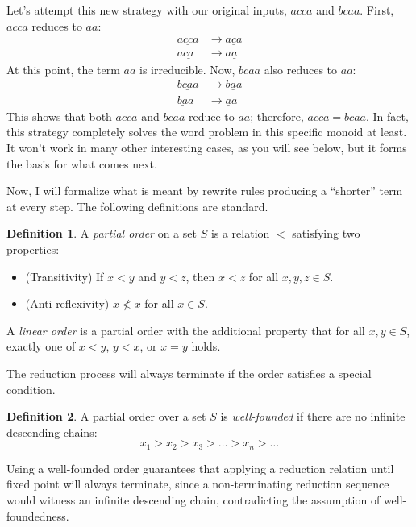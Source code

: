 \documentclass[headsepline,bibliography=totoc]{scrreport}
\theoremstyle{definition}
\theoremstyle{definition}
\newtheorem{definition}{Definition}[chapter]
\theoremstyle{definition}
\begin{document}
Let's attempt this new strategy with our original inputs, $acca$ and $bcaa$. First, $acca$ reduces to $aa$:
\begin{align}
a\underline{cc}a&\rightarrow a\underline{c}a\tag{Rule 1}\\
a\underline{ca}&\rightarrow a\underline{a}\tag{Rule 3}
\end{align}
At this point, the term $aa$ is irreducible. Now, $bcaa$ also reduces to $aa$:
\begin{align}
b\underline{ca}a&\rightarrow b\underline{a}a\tag{Rule 3}\\
\underline{ba}a&\rightarrow \underline{a}a\tag{Rule 2}
\end{align}
This shows that both $acca$ and $bcaa$ reduce to $aa$; therefore, $acca=bcaa$. In fact, this strategy completely solves the word problem in this specific monoid at least. It won't work in many other interesting cases, as you will see below, but it forms the basis for what comes next.

Now, I will formalize what is meant by rewrite rules producing a ``shorter'' term at every step. The following definitions are standard.
\begin{definition}\label{partialorderdef}
A \emph{partial order} on a set $S$ is a relation $<$ satisfying two properties:
\begin{itemize}
\item (Transitivity) If $x<y$ and $y<z$, then $x<z$ for all $x,y,z \in S$.
\item (Anti-reflexivity) $x\nless x$ for all $x\in S$.
\end{itemize}
A \emph{linear order} is a partial order with the additional property that for all $x, y \in S$, exactly one of $x<y$, $y<x$, or $x=y$ holds.
\end{definition}

The reduction process will always terminate if the order satisfies a special condition.
\begin{definition}\label{wellfounded}
A partial order over a set $S$ is \emph{well-founded} if there are no infinite descending chains:
\[x_1>x_2>x_3>\ldots>x_n>\ldots\]
\end{definition}

Using a well-founded order guarantees that applying a reduction relation until fixed point will always terminate, since a non-terminating reduction sequence would witness an infinite descending chain, contradicting the assumption of well-foundedness.
\end{document}

